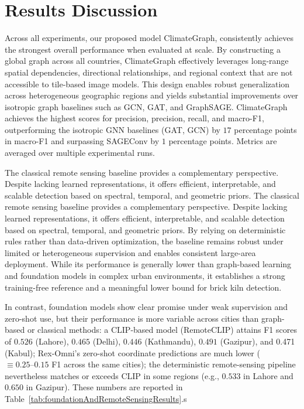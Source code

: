 \documentclass{article}
\theoremstyle{plain}
\theoremstyle{definition}
\theoremstyle{remark}
\begin{document}
\section{Results Discussion}
Across all experiments, our proposed model ClimateGraph, consistently achieves the strongest overall performance when evaluated at scale. By constructing a global graph across all countries, ClimateGraph effectively leverages long-range spatial dependencies, directional relationships, and regional context that are not accessible to tile-based image models. This design enables robust generalization across heterogeneous geographic regions and yields substantial improvements over isotropic graph baselines such as GCN, GAT, and GraphSAGE. 
ClimateGraph achieves the highest scores for precision, precision, recall, and macro-F1, outperforming the isotropic GNN baselines (GAT, GCN) by $17$ percentage points in macro-F1 and surpassing SAGEConv by $1$ percentage points. Metrics are averaged over multiple experimental runs.

The classical remote sensing baseline provides a complementary perspective. Despite lacking learned representations, it offers efficient, interpretable, and scalable detection based on spectral, temporal, and geometric priors. The classical remote sensing baseline provides a complementary perspective. Despite lacking learned representations, it offers efficient, interpretable, and scalable detection based on spectral, temporal, and geometric priors. By relying on deterministic rules rather than data-driven optimization, the baseline remains robust under limited or heterogeneous supervision and enables consistent large-area deployment. While its performance is generally lower than graph-based learning and foundation models in complex urban environments, it establishes a strong training-free reference and a meaningful lower bound for brick kiln detection.

In contrast, foundation models show clear promise under weak supervision and zero-shot use, but their performance is more variable across cities than graph-based or classical methods: a CLIP-based model (RemoteCLIP) attains F1 scores of $0.526$ (Lahore), $0.465$ (Delhi), $0.446$ (Kathmandu), $0.491$ (Gazipur), and 0.471 (Kabul); Rex-Omni’s zero-shot coordinate predictions are much lower ($\equiv 0.25–0.15$ F1 across the same cities); the deterministic remote-sensing pipeline nevertheless matches or exceeds CLIP in some regions (e.g., $0.533$ in Lahore and $0.650$ in Gazipur). These numbers are reported in Table~\ref{tab:foundationAndRemoteSensingResults}.s
\end{document}
